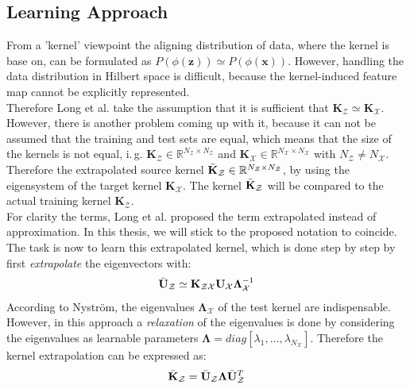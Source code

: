 \subsection{Learning Approach}\label{InSubSecLearnApp}
From a 'kernel' viewpoint the aligning distribution of data, where the kernel is base on, can be formulated as $P(\phi(\mathbf{z})) \simeq P(\phi(\mathbf{x}))$.\cite{Long.2015}
However, handling the data distribution in Hilbert space is difficult, because the kernel-induced feature map cannot be explicitly represented.\cite{KaiZhang.2013}\\
Therefore Long et al. take the assumption that it is sufficient that $\mathbf{K}_\mathcal{Z} \simeq \mathbf{K}_\mathcal{X}$.
However, there is another problem coming up with it, because it can not be assumed that the training and test sets are equal, which means that the size of the kernels is not equal, i.\,g. $\mathbf{K}_\mathcal{Z} \in \mathbb{R}^{N_\mathcal{Z}\times N_\mathcal{Z}}$ and $\mathbf{K}_\mathcal{X} \in \mathbb{R}^{N_\mathcal{X}\times N_\mathcal{X}}$ with $N_\mathcal{Z} \neq N_\mathcal{X}$.
Therefore the extrapolated source kernel $\bar{\mathbf{K}}_\mathcal{Z} \in \mathbb{R}^{N_\mathcal{Z}\times N_\mathcal{Z}}$, by using the eigensystem of the target kernel $\mathbf{K}_\mathcal{X}$. The kernel  $\bar{\mathbf{K}}_\mathcal{Z} $ will be compared to the actual training kernel $\mathbf{K}_\mathcal{Z}$.\cite{Long.2015}\\
For clarity the terms, Long et al. proposed the term extrapolated instead of approximation.\cite{Long.2015}
In this thesis, we will stick to the proposed notation to coincide.\\
The task is now to learn this extrapolated kernel, which is done step by step by first \textit{extrapolate} the eigenvectors with:\cite{Long.2015}
\begin{equation}\label{EqExtraEigs}
	\bar{\mathbf{U}}_\mathcal{Z} \simeq \mathbf{K}_\mathcal{ZX}\mathbf{U}_\mathcal{X} \boldsymbol{\Lambda}_\mathcal{X}^{-1}
\end{equation}
According to Nyström, the eigenvalues $\boldsymbol{\Lambda}_\mathcal{X}$ of the test kernel are indispensable.
However, in this approach a \textit{relaxation} of the eigenvalues is done by considering the eigenvalues as learnable parameters $\boldsymbol{\Lambda} = diag[\lambda_1,\dots,\lambda_{N_\mathcal{X}}]$.
Therefore the kernel extrapolation can be expressed as:\cite{Long.2015}
\begin{equation}
	\bar{\mathbf{K}}_\mathcal{Z} = \bar{\mathbf{U}}_\mathcal{Z} \boldsymbol{\Lambda} \bar{\mathbf{U}}_\mathcal{Z}^T
\end{equation}
